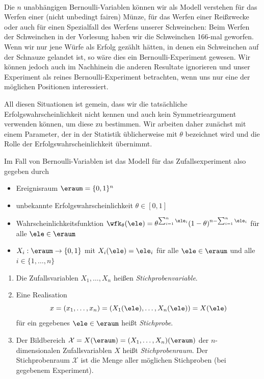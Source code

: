 \begin{bsp}  \\
    Die $n$ unabhängigen \gls{Bernoulli-Variable}n können wir als Modell verstehen für das Werfen einer (nicht
unbedingt fairen) Münze, für das Werfen einer Reißzwecke oder auch für einen Spezialfall des Werfens unserer
Schweinchen: Beim Werfen der Schweinchen in der Vorlesung haben wir die Schweinchen 166-mal geworfen.
    Wenn wir nur jene Würfe als Erfolg gezählt hätten, in denen ein Schweinchen auf der Schnauze gelandet ist, so
wäre dies ein Bernoulli-Experiment gewesen.
    Wir können jedoch auch im Nachhinein die anderen Resultate ignorieren und unser Experiment als reines
Bernoulli-Experiment betrachten, wenn uns nur eine der möglichen Positionen interessiert.

    All diesen Situationen ist gemein, dass wir die tatsächliche Erfolgswahrscheinlichkeit nicht kennen und auch
kein Symmetrieargument verwenden können, um diese zu bestimmen.
    Wir arbeiten daher zunächst mit einem Parameter, der in der Statistik üblicherweise mit $\theta$ bezeichnet wird
und die Rolle der Erfolgswahrscheinlichkeit übernimmt.

    Im Fall von \gls{Bernoulli-Variable}n ist das Modell für das Zufallsexperiment also gegeben durch
    \begin{itemize}
        \item Ereignisraum $\eraum=\{0,1\}^n$
        \item unbekannte Erfolgswahrscheinlichkeit $\theta\in[0,1]$
        \item Wahrscheinlichkeitsfunktion $\wfk_\theta(\ele) = \theta^{\sum_{i=1}^n \ele_i}(1-\theta)^{n-\sum_{i=1}^n\ele_i}$ für alle $\ele\in\eraum$
        \item $X_i:\eraum\to\{0,1\}$ mit $X_i(\ele)=\ele_i$ für alle $\ele\in\eraum$ und alle $i\in\{1,\dots,n\}$
    \end{itemize}
\end{bsp}

\begin{defi} 
\begin{enumerate}[label=(\alph*)]
    \item Die Zufallsvariablen $X_1,\dots,X_n$ heißen \emph{Stichprobenvariable}.
    \item Eine Realisation
    \[
        x = (x_1,\dots,x_n) = (X_1(\ele),\dots,X_n(\ele)) = X(\ele)
    \]
    für ein gegebenes $\ele\in\eraum$ heißt \emph{Stichprobe}.
    \item Der Bildbereich $\mathcal{X} = X(\eraum) = (X_1,\dots,X_n)(\eraum)$ der $n$-dimensionalen Zufallsvariablen $X$ heißt \emph{Stichprobenraum}.
    Der \gls{Stichprobenraum} $\mathcal X$ ist die Menge aller möglichen Stichproben (bei gegebenem Experiment).
\end{enumerate}
\end{defi}

